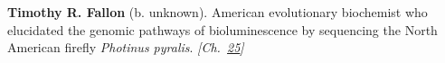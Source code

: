 \textbf{Timothy R. Fallon} (b. unknown). American evolutionary biochemist who elucidated the genomic pathways of bioluminescence by sequencing the North American firefly \emph{Photinus pyralis}. \emph{[Ch.~\hyperref[ch:fireflybioluminescence]{25}]}

